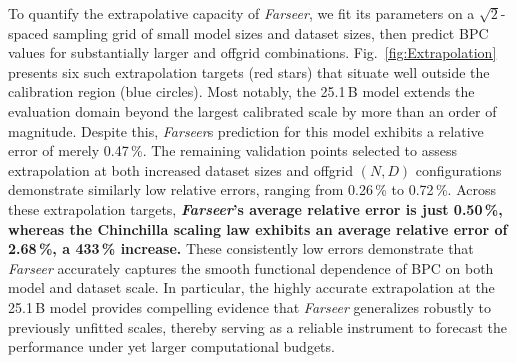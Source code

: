 \documentclass{article}
\begin{document}



To quantify the extrapolative capacity of \textit{Farseer}, we fit its parameters on a $\sqrt{2}$-spaced sampling grid of small model sizes and dataset sizes, then predict BPC values for substantially larger and off\text{-}grid combinations. Fig.~\ref{fig:Extrapolation} presents six such extrapolation targets (red stars) that situate well outside the calibration region (blue circles). Most notably, the 25.1\,B model extends the evaluation domain beyond the largest calibrated scale by more than an order of magnitude. Despite this, \textit{Farseer}s prediction for this model exhibits a relative error of merely 0.47\,\%. The remaining validation points selected to assess extrapolation at both increased dataset sizes and off\text{-}grid $(N,D)$ configurations demonstrate similarly low relative errors, ranging from 0.26\,\% to 0.72\,\%. Across these extrapolation targets, \textbf{\textit{Farseer}'s average relative error is just 0.50\,\%, whereas the Chinchilla scaling law exhibits an average relative error of 2.68\,\%, a 433\,\% increase.} These consistently low errors demonstrate that \textit{Farseer} accurately captures the smooth functional dependence of BPC on both model and dataset scale. In particular, the highly accurate extrapolation at the 25.1\,B model provides compelling evidence that \textit{Farseer} generalizes robustly to previously unfitted scales, thereby serving as a reliable instrument to forecast the performance under yet larger computational budgets.
\end{document}
